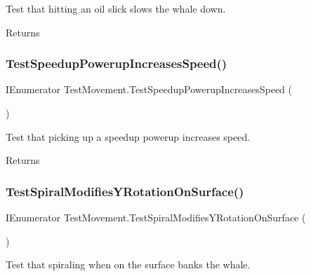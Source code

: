 Test that hitting an oil slick slows the whale down. 

\begin{DoxyReturn}{Returns}

\end{DoxyReturn}
\mbox{\label{class_test_movement_a7a866849fbeb51e7c3d500b1fc3d5a09}} 
\subsubsection{\texorpdfstring{Test\+Speedup\+Powerup\+Increases\+Speed()}{TestSpeedupPowerupIncreasesSpeed()}}
{\footnotesize\ttfamily I\+Enumerator Test\+Movement.\+Test\+Speedup\+Powerup\+Increases\+Speed (\begin{DoxyParamCaption}{ }\end{DoxyParamCaption})}



Test that picking up a speedup powerup increases speed. 

\begin{DoxyReturn}{Returns}

\end{DoxyReturn}
\mbox{\label{class_test_movement_ad490417a5ff71ec4c013a0dc34da901f}} 
\subsubsection{\texorpdfstring{Test\+Spiral\+Modifies\+Y\+Rotation\+On\+Surface()}{TestSpiralModifiesYRotationOnSurface()}}
{\footnotesize\ttfamily I\+Enumerator Test\+Movement.\+Test\+Spiral\+Modifies\+Y\+Rotation\+On\+Surface (\begin{DoxyParamCaption}{ }\end{DoxyParamCaption})}



Test that spiraling when on the surface banks the whale. 

